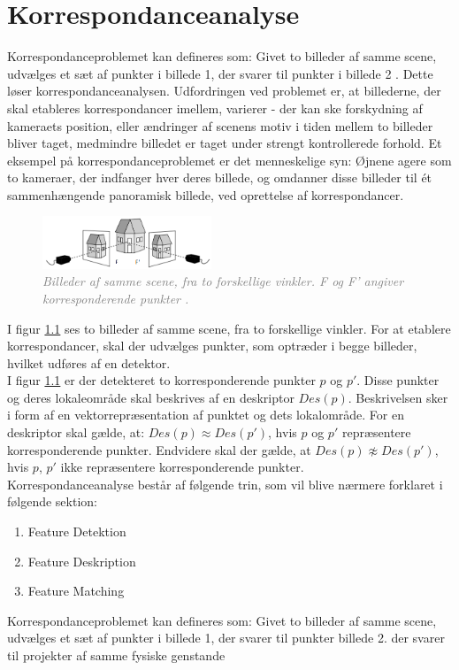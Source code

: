 \chapter{Korrespondanceanalyse} \label{sec:Kor}
Korrespondanceproblemet kan defineres som: Givet to billeder af samme scene, udvælges et sæt af punkter i billede 1, der svarer til punkter i billede 2 \cite{Stefano}. Dette løser korrespondanceanalysen. Udfordringen ved problemet er, at billederne, der skal etableres korrespondancer imellem, varierer - der kan ske forskydning af kameraets position, eller ændringer af scenens motiv i tiden mellem to billeder bliver taget, medmindre billedet er taget under strengt kontrollerede forhold. 
Et eksempel på korrespondanceproblemet er det menneskelige syn: Øjnene agere som to kameraer, der indfanger  hver deres billede, og omdanner disse billeder til ét sammenhængende panoramisk billede, ved oprettelse af korrespondancer. \\
\begin{figure}[H]
    \centering
    \includegraphics[width=0.45\textwidth]{fig/3.png}
     \vspace{-1em}
    \begin{center}    
       \caption{\textcolor{gray}{\footnotesize \textit{Billeder af samme scene, fra to forskellige vinkler. F og F' angiver korresponderende punkter \cite{kim}.}}}
    \label{fig:1}
     \end{center}
     \vspace{-2.5em}
  \end{figure} \noindent
I figur \ref{fig:1} ses to billeder af samme scene, fra to forskellige vinkler. For at etablere korrespondancer, skal der udvælges punkter, som optræder i begge billeder, hvilket udføres af en detektor.
\\
I figur \ref{fig:1} er der detekteret to korresponderende punkter $p$ og $p'$. Disse punkter og deres lokaleområde skal beskrives af en deskriptor $Des(p)$. Beskrivelsen sker i form af en vektorrepræsentation af punktet og dets lokalområde. 
For en deskriptor skal gælde, at: $Des(p)\approx Des(p')$, hvis $p$ og $p'$ repræsentere korresponderende punkter. Endvidere skal der gælde, at $Des(p)\not \approx Des(p')$, hvis $p$, $p'$ ikke repræsentere korresponderende punkter. \\
Korrespondanceanalyse består af følgende trin, som vil blive nærmere forklaret i følgende sektion:
\begin{enumerate}
\item{Feature Detektion}
\item{Feature Deskription}
\item{Feature Matching}
\end{enumerate}





Korrespondanceproblemet kan defineres som: Givet to billeder af samme scene, udvælges et sæt af punkter i billede 1, der svarer til punkter billede 2. der svarer til projekter af samme fysiske genstande